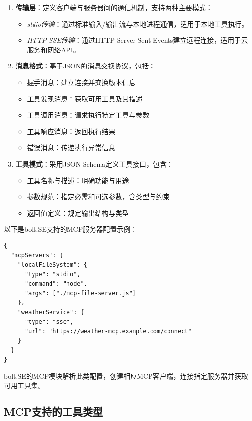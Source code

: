 \begin{enumerate}
  \item \textbf{传输层}：定义客户端与服务器间的通信机制，支持两种主要模式：
    \begin{itemize}
      \item \textit{stdio传输}：通过标准输入/输出流与本地进程通信，适用于本地工具执行。
      \item \textit{HTTP SSE传输}：通过HTTP Server-Sent Events建立远程连接，适用于云服务和网络API。
    \end{itemize}
  
  \item \textbf{消息格式}：基于JSON的消息交换协议，包括：
    \begin{itemize}
      \item 握手消息：建立连接并交换版本信息
      \item 工具发现消息：获取可用工具及其描述
      \item 工具调用消息：请求执行特定工具与参数
      \item 工具响应消息：返回执行结果
      \item 错误消息：传递执行异常信息
    \end{itemize}
  
  \item \textbf{工具模式}：采用JSON Schema定义工具接口，包含：
    \begin{itemize}
      \item 工具名称与描述：明确功能与用途
      \item 参数规范：指定必需和可选参数，含类型与约束
      \item 返回值定义：规定输出结构与类型
    \end{itemize}
\end{enumerate}

以下是bolt.SE支持的MCP服务器配置示例：

\begin{verbatim}
{
  "mcpServers": {
    "localFileSystem": {
      "type": "stdio",
      "command": "node",
      "args": ["./mcp-file-server.js"]
    },
    "weatherService": {
      "type": "sse",
      "url": "https://weather-mcp.example.com/connect"
    }
  }
}
\end{verbatim}

bolt.SE的MCP模块解析此类配置，创建相应MCP客户端，连接指定服务器并获取可用工具集。

\subsection{MCP支持的工具类型}


